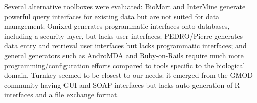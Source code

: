 Several alternative toolboxes were evaluated: BioMart\cite{xgap_molgenurl, Smedley_2009} and InterMine\cite{Lyne_2007} generate powerful query interfaces for existing data but are not suited for data management; Omixed\cite{xgap_omixed} generates programmatic interfaces onto databases, including a security layer, but lacks user interfaces; PEDRO/Pierre\cite{Jameson_2008} generates data entry and retrieval user interfaces but lacks programmatic interfaces; and general generators such as AndroMDA\cite{xgap_andromda} and Ruby-on-Rails\cite{xgap_ror} require much more programming/configuration efforts compared to tools specific to the biological domain.
Turnkey\cite{O_Connor_2008} seemed to be closest to our needs: it emerged from the GMOD community having GUI and SOAP interfaces but lacks auto-generation of R interfaces and a file exchange format.

